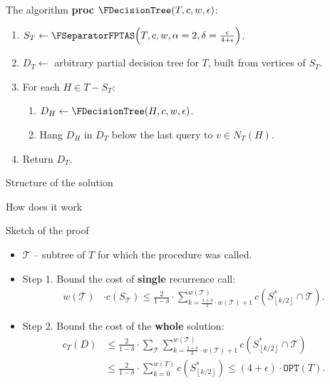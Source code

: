 \documentclass{beamer}
\newcommand{\br}[1]{\mathopen{}\left( #1 \right)}
\newcommand{\fl}[1]{\mathopen{}\left\lfloor #1 \right\rfloor}
\newcommand{\OPT}{\texttt{OPT}}
\begin{document}
\begin{frame}{The algorithm}
\textbf{proc} $\FDecisionTree\br{T,c,w,\epsilon}$:
\begin{enumerate}
    \item $S_T\gets\FSeparatorFPTAS\br{T, c, w, \alpha=2, \delta = \frac{\epsilon}{4+\epsilon}}$.
    \item $D_T\gets$ arbitrary partial decision tree for $T$, built from vertices of $S_T$.
    \item For each $H\in T-S_T$:
    \begin{enumerate}
        \item $D_H\gets\FDecisionTree\br{H,c,w,\epsilon}$.
        \item Hang $D_H$ in $D_T$ below the last query to $v\in N_T\br{H}$.
    \end{enumerate}
    \item Return $D_T$.
\end{enumerate}
\end{frame}

\begin{frame}{Structure of the solution}

\end{frame}

\begin{frame}{How does it work}
    
\end{frame}

\begin{frame}{Sketch of the proof}
\begin{itemize}
    \item $\mathcal{T}$ – subtree of $T$ for which the procedure was called.
    \item Step 1. Bound the cost of \textbf{single} recurrence call:
    \pause
            \begin{align*}
                w\br{\mathcal{T}}&\cdot c\br{S_{\mathcal{T}}}
                \leq \frac{2}{1-\delta}\cdot \sum_{k=\frac{1+\delta}{2}\cdot w\br{\mathcal{T}}+1}^{w\br{\mathcal{T}}}c\br{S_{\fl{k/2}}^*\cap \mathcal{T}}.
            \end{align*}\pause
    \item Step 2. Bound the cost of the \textbf{whole} solution:
    \begin{align*}
            c_T\br{D} &\leq 
            \frac{2}{1-\delta}\cdot\sum_{\mathcal{T}}\sum_{k=\frac{1+\delta}{2}\cdot w\br{\mathcal{T}}+1}^{w\br{\mathcal{T}}}c\br{S_{\fl{k/2}}^*\cap \mathcal{T}}\\
            &\leq \frac{2}{1-\delta}\cdot\sum_{k=0}^{w\br{T}}c\br{S_{\fl{k/2}}^*}\leq  \br{4+\epsilon}\cdot\OPT\br{T}.
    \end{align*}
\end{itemize} 
\end{frame}
\end{document}
